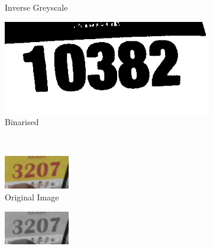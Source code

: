 \begin{figure}[h]
\begin{subfigure}[b]{0.23\textwidth}
    \caption{Inverse Greyscale}
  \end{subfigure}
  \hspace{\fill}
  \begin{subfigure}[b]{0.23\textwidth}
    \includegraphics[width=\textwidth]{images/processing/ocr/10382_inv}
    \caption{Binarised}
  \end{subfigure}
  \\ \bigskip
  \hspace{\fill}
  \begin{subfigure}[b]{0.23\textwidth}
    \includegraphics[width=\textwidth]{images/processing/ocr/3207_org}
    \caption{Original Image}
    \label{fig:processing_pipeline:ocr_postprocessing:color_original}
  \end{subfigure}
  \hspace{\fill}
  \begin{subfigure}[b]{0.23\textwidth}
    \includegraphics[width=\textwidth]{images/processing/ocr/3207_bw}

\end{subfigure}
\end{figure}

